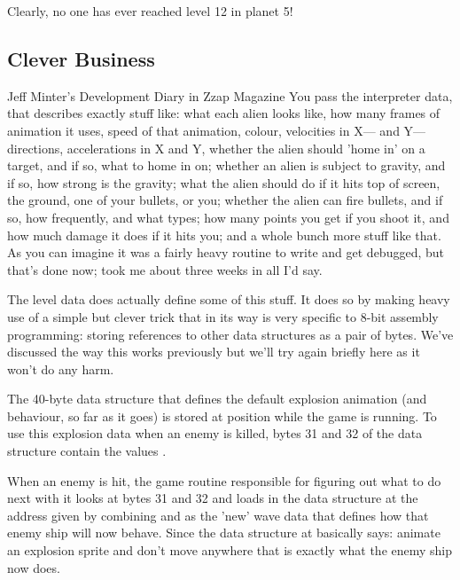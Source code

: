 %


Clearly, no one has ever reached level 12 in planet 5!

\subsection{Clever Business}
\begin{q}{Jeff Minter's Development Diary in Zzap Magazine\cite{planner}}
You pass the interpreter data, that describes exactly stuff like: what each
alien looks like, how many frames of animation it uses, speed of that
animation, colour, velocities in X— and Y— directions, accelerations in X and
Y, whether the alien should 'home in' on a target, and if so, what to home in
on; whether an alien is subject to gravity, and if so, how strong is the
gravity; what the alien should do if it hits top of screen, the ground, one of
your bullets, or you; whether the alien can fire bullets, and if so, how
frequently, and what types; how many points you get if you shoot it, and how
much damage it does if it hits you; and a whole bunch more stuff like that. As
you can imagine it was a fairly heavy routine to write and get debugged, but
that's done now; took me about three weeks in all I'd say.
\end{q}

The level data does actually define some of this stuff. It does so by making
heavy use of a simple but clever trick that in its way is very specific to
8-bit assembly programming: storing references to other data structures as
a pair of bytes. We've discussed the way this works previously but we'll try
again briefly here as it won't do any harm. 

The 40-byte data structure that defines the default explosion animation (and
behaviour, so far as it goes) is stored at position  while the
game is running. To use this explosion data when an enemy is killed, bytes 31
and 32 of the data structure contain the values . 

When an enemy is hit, the game routine responsible for figuring out what to do next
with it looks at bytes 31 and 32 and loads in the data structure at the address
given by combining  and  as the 'new' wave data that
defines how that enemy ship will now behave. Since the data structure at
 basically says: animate an explosion sprite and don't move
anywhere that is exactly what the enemy ship now does.

